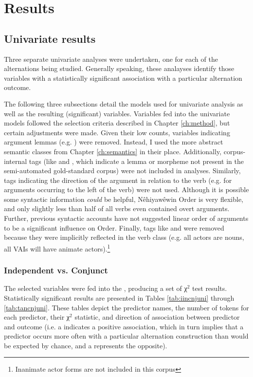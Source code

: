 \chapter{Results}
\label{ch:result}
\section{Univariate results}

Three separate univariate analyses were undertaken, one for each of the alternations being studied. Generally speaking, these analayses identify those variables with a statistically significant association with a particular alternation outcome. 

The following three subsections detail the models used for univariate analysis as well as the resulting (significant) variables. Variables fed into the univariate models followed the selection criteria described in Chapter \ref{ch:method}, but certain adjustments were made. Given their low counts, variables indicating argument lemmas (e.g. ) were removed. Instead, I used the more abstract semantic classes from Chapter \ref{ch:semantics} in their place. Additionally, corpus-internal tags (like  and , which indicate a lemma or morpheme not present in the semi-automated gold-standard corpus) were not included in analyses. Similarly, tags indicating the direction of the argument in relation to the verb (e.g.  for arguments occurring to the left of the verb) were not used. Although it is possible some syntactic information \textit{could} be helpful, Nêhiyawêwin Order is very flexible, and only slightly less than half of all verbs even contained overt arguments. Further, previous syntactic accounts have not suggested linear order of arguments to be a significant influence on Order. Finally, tags like  and  were removed because they were implicitly reflected in the verb class (e.g. all actors are nouns, all VAIs will have animate actors).\footnote{Inanimate actor forms are not included in this corpus} 

\subsection{Independent vs. Conjunct}
The selected variables were fed into the , producing a set of  χ$^{2}$ test results. Statistically significant results are presented in Tables \ref{tab:iincnjuni} through \ref{tab:tancnjuni}. These tables depict the predictor names, the number of tokens for each predictor, their χ$^{2}$ statistic, and direction of association between predictor and outcome (i.e. a \codebox{+} indicates a positive association, which in turn implies that a predictor occurs more often with a particular alternation construction than would be expected by chance, and a \codebox{-} represents the opposite).

